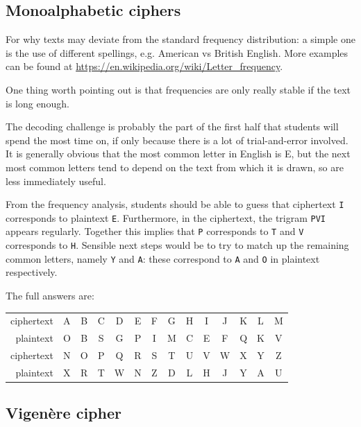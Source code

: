 \documentclass[12pt]{article}
\begin{document}
\subsection{Monoalphabetic ciphers}

For why texts may deviate from the standard frequency distribution: a simple one is the use of different spellings, e.g. American vs British English. More examples can be found at \url{https://en.wikipedia.org/wiki/Letter_frequency}.

One thing worth pointing out is that frequencies are only really stable if the text is long enough.

The decoding challenge is probably the part of the first half that students will spend the most time on, if only because there is a lot of trial-and-error involved.
It is generally obvious that the most common letter in English is E, but the next most common letters tend to depend on the text from which it is drawn, so are less immediately useful.

From the frequency analysis, students should be able to guess that ciphertext \texttt{I} corresponds to plaintext \texttt{E}.
Furthermore, in the ciphertext, the trigram \texttt{PVI} appears regularly.
Together this implies that \texttt{P} corresponds to \texttt{T} and \texttt{V} corresponds to \texttt{H}.
Sensible next steps would be to try to match up the remaining common letters, namely \texttt{Y} and \texttt{A}: these correspond to \texttt{A} and \texttt{O} in plaintext respectively.

The full answers are:

\begin{center}
    \ttfamily
    \begin{tabular}{rccccccccccccc}
        \textrm{ciphertext} & A & B & C & D & E & F & G & H & I & J & K & L & M \\
        \textrm{plaintext}  & O & B & S & G & P & I & M & C & E & F & Q & K & V \\
        \hline
        \textrm{ciphertext} & N & O & P & Q & R & S & T & U & V & W & X & Y & Z \\
        \textrm{plaintext}  & X & R & T & W & N & Z & D & L & H & J & Y & A & U \\
    \end{tabular}
\end{center}

\subsection{Vigen{\`e}re cipher}
\end{document}

